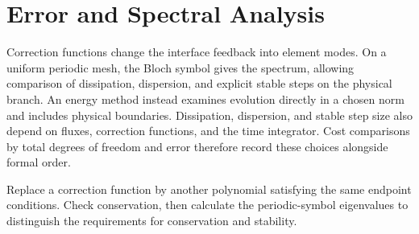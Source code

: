 \section{Error and Spectral Analysis}
Correction functions change the interface feedback into element modes. On a uniform periodic mesh, the Bloch symbol gives the spectrum,
allowing comparison of dissipation, dispersion, and explicit stable steps on the physical branch.
An energy method instead examines evolution directly in a chosen norm and includes physical boundaries.
Dissipation, dispersion, and stable step size also depend on fluxes, correction functions, and the time integrator. Cost comparisons by total degrees of freedom and error therefore record these choices alongside formal order.

{Replace a correction function by another polynomial satisfying the same endpoint conditions. Check conservation, then calculate the periodic-symbol eigenvalues to distinguish the requirements for conservation and stability.}
